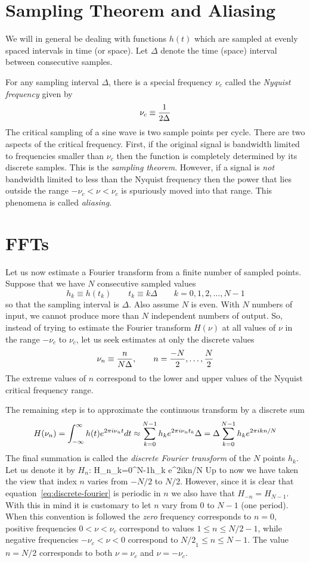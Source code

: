 \section{Sampling Theorem and Aliasing}

We will in general be dealing with functions $h(t)$ which are sampled
at evenly spaced intervals in time (or space). Let $\Delta$ denote the 
time (space) interval between consecutive samples.

For any sampling interval $\Delta$, there is a special frequency
$\nu_c$ called the {\it Nyquist frequency} given by 
\[
\nu_c\equiv{1\over 2\Delta}
\]
The critical sampling of a sine wave is two sample points per
cycle. There are two aspects of the critical frequency. First, if the
original signal is bandwidth limited to frequencies smaller than
$\nu_c$ then the function is completely determined by its discrete
samples. This is the {\it sampling theorem}. However, if a signal is
{\it not} bandwidth limited to less than the Nyquist frequency then
the power that lies outside the range $-\nu_c<\nu<\nu_c$ is spuriously
moved into that range. This phenomena is called {\it aliasing}. 

\section{FFTs}

Let us now estimate a Fourier transform from a finite number of sampled points.
Suppose that we have $N$ consecutive sampled values
\[
h_k\equiv h(t_k) \qquad t_k\equiv k\Delta \qquad k=0,1,2,\ldots,N-1 
\]
so that the sampling interval is $\Delta$. Also assume $N$ is even. With $N$ 
numbers of input, we cannot produce more than $N$ independent numbers of 
output. So, instead of trying to estimate the Fourier transform $H(\nu)$ at 
all values of $\nu$ in the range $-\nu_c$ to $\nu_c$, let us seek estimates 
at only the discrete values
\[
\nu_n\equiv{n\over N\Delta},\qquad n={-N\over 2},\ldots,{N\over 2} 
\]
The extreme values of $n$ correspond to the lower and upper values of the 
Nyquist critical frequency range. 

The remaining step is to approximate the continuous transform by a discrete 
sum
\[
H(\nu_n)=\int_{-\infty}^{\infty} h(t)e^{2\pi i \nu_nt}dt\approx \sum_{k=0}^{N-1}h_ke^{2\pi i\nu_nt_k}\Delta=\Delta\sum_{k=0}^{N-1}h_k e^{2\pi ikn/N}
\]
The final summation is called the {\it discrete Fourier transform} of the $N$ 
points $h_k$. Let us denote it by $H_n$:
\be
H_n\equiv\sum_{k=0}^{N-1}h_k e^{2\pi ikn/N}
\label{eq:discrete-fourier}
\ee
Up to now we have taken the view that index $n$ varies from $-N/2$ to $N/2$. 
However, since it is clear that equation~\ref{eq:discrete-fourier} is 
periodic in $n$ we also have that $H_{-n}=H_{N-1}$. With this in mind it is 
customary to let $n$ vary from $0$ to $N-1$ (one period). When this convention
is followed the {\it zero} frequency corresponds to $n=0$, positive 
frequencies $0<\nu<\nu_c$ correspond to values $1\le n\le {N/2}-1$, while
negative frequencies $-\nu_c<\nu<0$ correspond to ${N/2}_1\le n \le N-1$. The
value $n={N/2}$ corresponds to both $\nu=\nu_c$ and $\nu=-\nu_c$.

